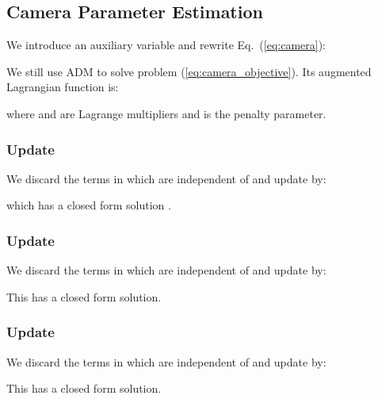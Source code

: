 \documentclass[10pt,twocolumn,letterpaper]{article}
\begin{document}
\subsection{Camera Parameter Estimation}
We introduce an auxiliary variable  and rewrite
Eq.~(\ref{eq:camera}):


We still use ADM to solve problem (\ref{eq:camera_objective}). Its
augmented Lagrangian function is:

where  and  are Lagrange multipliers and  is the
penalty parameter.

\subsubsection{Update }
We discard the terms in  which are independent of
 and update  by:

which has a closed form solution \cite{liu2013linearized}.
\subsubsection{Update }
We discard the terms in  which are independent of
 and update  by:

This has a closed form solution.

\subsubsection{Update }
We discard the terms in  which are independent of
 and update  by:

This has a closed form solution.
\end{document}
